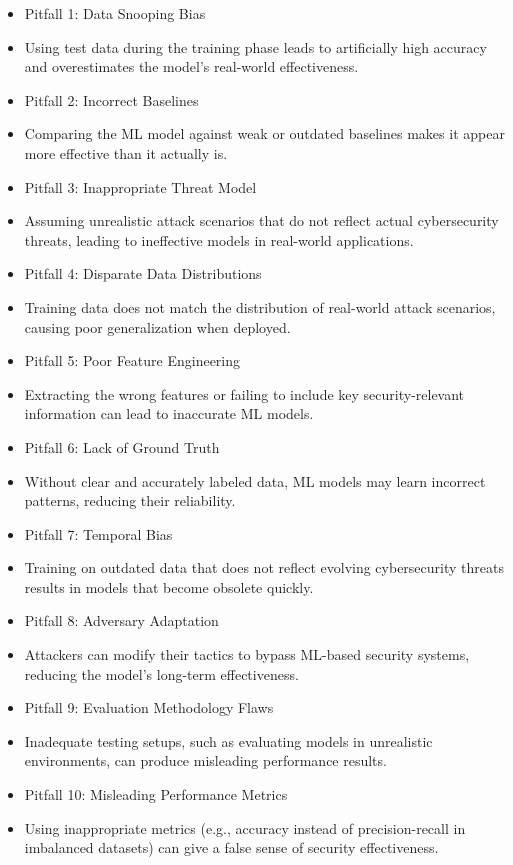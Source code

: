 \documentclass{article}
\begin{document}
\begin{itemize}
  \item[] Pitfall 1: Data Snooping Bias
    \item Using test data during the training phase leads to artificially high accuracy and overestimates the model's real-world effectiveness.
  \item[] Pitfall 2: Incorrect Baselines
    \item Comparing the ML model against weak or outdated baselines makes it appear more effective than it actually is.
  \item[] Pitfall 3: Inappropriate Threat Model
    \item Assuming unrealistic attack scenarios that do not reflect actual cybersecurity threats, leading to ineffective models in real-world applications.
  \item[] Pitfall 4: Disparate Data Distributions
    \item Training data does not match the distribution of real-world attack scenarios, causing poor generalization when deployed.
  \item[] Pitfall 5: Poor Feature Engineering
    \item Extracting the wrong features or failing to include key security-relevant information can lead to inaccurate ML models.
  \item[] Pitfall 6: Lack of Ground Truth
    \item Without clear and accurately labeled data, ML models may learn incorrect patterns, reducing their reliability.
  \item[] Pitfall 7: Temporal Bias
    \item Training on outdated data that does not reflect evolving cybersecurity threats results in models that become obsolete quickly.
  \item[] Pitfall 8: Adversary Adaptation
    \item Attackers can modify their tactics to bypass ML-based security systems, reducing the model's long-term effectiveness.
  \item[] Pitfall 9: Evaluation Methodology Flaws
    \item Inadequate testing setups, such as evaluating models in unrealistic environments, can produce misleading performance results.
  \item[] Pitfall 10: Misleading Performance Metrics
    \item Using inappropriate metrics (e.g., accuracy instead of precision-recall in imbalanced datasets) can give a false sense of security effectiveness.
\end{itemize}
\end{document}

